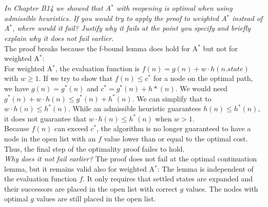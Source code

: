 \documentclass{article} %
\begin{document}
\section{}
\textit{In Chapter B14 we showed that A$^*$ with reopening is optimal when using admissible heuristics. If
you would try to apply the proof to weighted A$^*$ instead of A$^*$, where would it fail? Justify why
it fails at the point you specify and briefly explain why it does not fail earlier.}\\[0.5em]
The proof breaks because the f-bound lemma does hold for A$^*$ but not for
weighted A$^*$:\\[0.5em]
For weighted A$^*$, the evaluation function is
$f(n) = g(n) + w \cdot h(n.state)$ with $ w \geq 1$.
If we try to show that $f(n) \leq c^*$ for a node on the
optimal path, we have $g(n) = g^*(n)$ and $c^* = g^*(n) + h*(n)$.
We would need $g^*(n) + w \cdot h(n) \leq g^*(n) + h^*(n)$.
We can simplify that to $w \cdot h(n) \leq h^*(n)$. While
an admissible heuristic guarantees $h(n) \leq h^*(n)$, it does
not guarantee that $w \cdot h(n) \leq h^*(n)$ when $w > 1$.\\[0.5em]
Because $f(n)$ can exceed $c^*$, the algorithm is no longer
guaranteed to have a node in the open list with an $f$ value
lower than or equal to the optimal cost. Thus, the final step of
the optimality proof failes to hold.\\[0.5em]
\textit{Why does it not fail earlier?} The proof does not fail 
at the optimal continuation lemma, but it remains valid also for
weighted A$^*$: The lemma is independent of the evaluation function
$f$. It only requires that settled states are expanded and their
successors are placed in the open list with correct $g$ values.
The nodes with optimal $g$ values are still placed in the open
list.

\newpage
\end{document}
